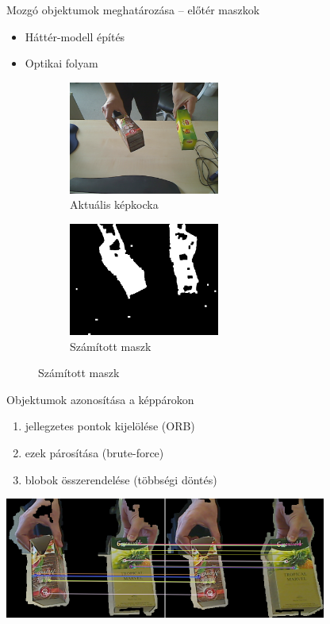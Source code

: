\begin{frame}{Mozgó objektumok meghatározása -- előtér maszkok}

\begin{itemize}
\item {\color{gray} Háttér-modell építés}
\item Optikai folyam
\end{itemize}

\begin{figure}[tbh]
\centering
\begin{subfigure}[b]{.49\linewidth}
	\centering
	\includegraphics[width=140pt]{figures/frame_ofmask_107.png}
	\caption{Aktuális képkocka}
  \end{subfigure}
\begin{subfigure}[b]{.49\linewidth}
	\centering
	\includegraphics[width=140pt]{figures/mask_ofmask_107.png}
	\caption{Számított maszk}
  \end{subfigure}
\end{figure}

\end{frame}


\begin{frame}{Objektumok azonosítása a képpárokon}
\begin{enumerate}
    \item jellegzetes pontok kijelölése (ORB)
    \item ezek párosítása (brute-force)
    \item blobok összerendelése (többségi döntés)
\end{enumerate}

\vspace{10pt}
\centering
\includegraphics[width=300pt]{figures/multi_obj_matches.png}

\end{frame}



